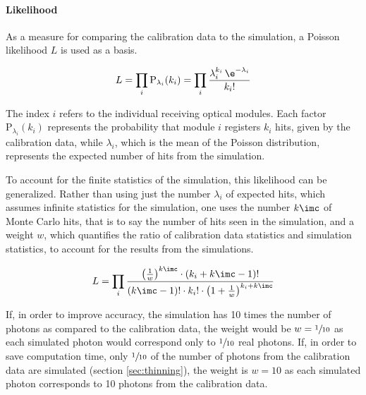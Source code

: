 \paragraph{Likelihood}
As a measure for comparing the calibration data to the simulation, a Poisson likelihood $L$ is used as a basis.

\begin{equation}
  L = \prod_{i} \text{P}_{\lambda_i}(k_i) = \prod_{i} \frac{\lambda_i^{k_i}\,\e^{-\lambda_i}}{k_i !}
\end{equation}

The index $i$ refers to the individual receiving optical modules. Each factor $\text{P}_{\lambda_i}(k_i)$ represents the probability that module $i$ registers $k_i$ hits, given by the calibration data, while $\lambda_i$, which is the mean of the Poisson distribution, represents the expected number of hits from the simulation.

%
%

To account for the finite statistics of the simulation, this likelihood can be generalized. Rather than using just the number $\lambda_i$ of expected hits, which assumes infinite statistics for the simulation, one uses the number $k\imc$ of Monte Carlo hits, that is to say the number of hits seen in the simulation, and a weight $w$, which quantifies the ratio of calibration data statistics and simulation statistics, to account for the results from the simulations. \cite[equation 21]{Gluesenkamp2018}

\begin{equation}
  L = \prod_{i} \frac%
    {\left(\frac{1}{w}\right)^{k\imc} \cdot \left(k_i + k\imc - 1\right)!}%
    {(k\imc - 1)! \cdot k_i! \cdot \left( 1 + \frac{1}{w} \right)^{k_i + k\imc}}
\end{equation}

If, in order to improve accuracy, the simulation has 10 times the number of photons as compared to the calibration data, the weight would be $w=\sfrac{1}{10}$ as each simulated photon would correspond only to $\sfrac{1}{10}$ real photons. If, in order to save computation time, only $\sfrac{1}{10}$ of the number of photons from the calibration data are simulated (section \ref{sec:thinning}), the weight is $w=10$ as each simulated photon corresponds to 10 photons from the calibration data.


